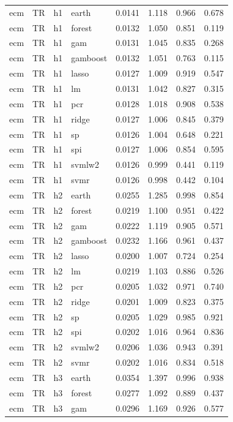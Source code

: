 \begin{ThreePartTable}
\begin{longtable}[t]{llclcccc}
\addlinespace
ecm & TR & h1 & earth & 0.0141 & 1.118 & 0.966 & 0.678\\
ecm & TR & h1 & forest & 0.0132 & 1.050 & 0.851 & 0.119\\
ecm & TR & h1 & gam & 0.0131 & 1.045 & 0.835 & 0.268\\
ecm & TR & h1 & gamboost & 0.0132 & 1.051 & 0.763 & 0.115\\
ecm & TR & h1 & lasso & 0.0127 & 1.009 & 0.919 & 0.547\\
ecm & TR & h1 & lm & 0.0131 & 1.042 & 0.827 & 0.315\\
ecm & TR & h1 & pcr & 0.0128 & 1.018 & 0.908 & 0.538\\
ecm & TR & h1 & ridge & 0.0127 & 1.006 & 0.845 & 0.379\\
ecm & TR & h1 & sp & 0.0126 & 1.004 & 0.648 & 0.221\\
ecm & TR & h1 & spi & 0.0127 & 1.006 & 0.854 & 0.595\\
ecm & TR & h1 & svmlw2 & 0.0126 & 0.999 & 0.441 & 0.119\\
ecm & TR & h1 & svmr & 0.0126 & 0.998 & 0.442 & 0.104\\
\addlinespace
ecm & TR & h2 & earth & 0.0255 & 1.285 & 0.998 & 0.854\\
ecm & TR & h2 & forest & 0.0219 & 1.100 & 0.951 & 0.422\\
ecm & TR & h2 & gam & 0.0222 & 1.119 & 0.905 & 0.571\\
ecm & TR & h2 & gamboost & 0.0232 & 1.166 & 0.961 & 0.437\\
ecm & TR & h2 & lasso & 0.0200 & 1.007 & 0.724 & 0.254\\
ecm & TR & h2 & lm & 0.0219 & 1.103 & 0.886 & 0.526\\
ecm & TR & h2 & pcr & 0.0205 & 1.032 & 0.971 & 0.740\\
ecm & TR & h2 & ridge & 0.0201 & 1.009 & 0.823 & 0.375\\
ecm & TR & h2 & sp & 0.0205 & 1.029 & 0.985 & 0.921\\
ecm & TR & h2 & spi & 0.0202 & 1.016 & 0.964 & 0.836\\
ecm & TR & h2 & svmlw2 & 0.0206 & 1.036 & 0.943 & 0.391\\
ecm & TR & h2 & svmr & 0.0202 & 1.016 & 0.834 & 0.518\\
\addlinespace
ecm & TR & h3 & earth & 0.0354 & 1.397 & 0.996 & 0.938\\
ecm & TR & h3 & forest & 0.0277 & 1.092 & 0.889 & 0.437\\
ecm & TR & h3 & gam & 0.0296 & 1.169 & 0.926 & 0.577\\

\end{longtable}
\end{ThreePartTable}
